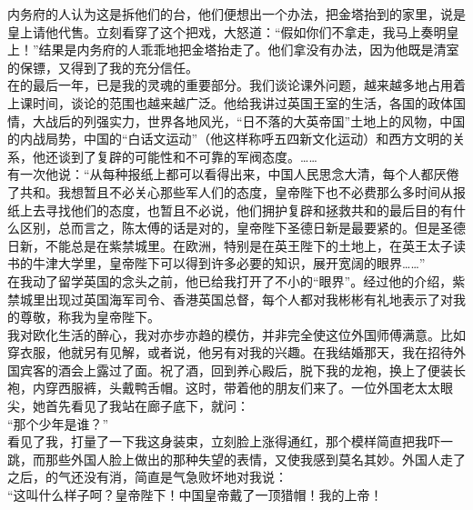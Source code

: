 内务府的人认为这是拆他们的台，他们便想出一个办法，把金塔抬到的家里，说是皇上请他代售。立刻看穿了这个把戏，大怒道：“假如你们不拿走，我马上奏明皇上！”结果是内务府的人乖乖地把金塔抬走了。他们拿没有办法，因为他既是清室的保镖，又得到了我的充分信任。\\

在的最后一年，已是我的灵魂的重要部分。我们谈论课外问题，越来越多地占用着上课时间，谈论的范围也越来越广泛。他给我讲过英国王室的生活，各国的政体国情，大战后的列强实力，世界各地风光，“日不落的大英帝国”土地上的风物，中国的内战局势，中国的“白话文运动”（他这样称呼五四新文化运动）和西方文明的关系，他还谈到了复辟的可能性和不可靠的军阀态度。……\\

有一次他说：“从每种报纸上都可以看得出来，中国人民思念大清，每个人都厌倦了共和。我想暂且不必关心那些军人们的态度，皇帝陛下也不必费那么多时间从报纸上去寻找他们的态度，也暂且不必说，他们拥护复辟和拯救共和的最后目的有什么区别，总而言之，陈太傅的话是对的，皇帝陛下圣德日新是最要紧的。但是圣德日新，不能总是在紫禁城里。在欧洲，特别是在英王陛下的土地上，在英王太子读书的牛津大学里，皇帝陛下可以得到许多必要的知识，展开宽阔的眼界……”\\

在我动了留学英国的念头之前，他已给我打开了不小的“眼界”。经过他的介绍，紫禁城里出现过英国海军司令、香港英国总督，每个人都对我彬彬有礼地表示了对我的尊敬，称我为皇帝陛下。\\

我对欧化生活的醉心，我对亦步亦趋的模仿，并非完全使这位外国师傅满意。比如穿衣服，他就另有见解，或者说，他另有对我的兴趣。在我结婚那天，我在招待外国宾客的酒会上露过了面。祝了酒，回到养心殿后，脱下我的龙袍，换上了便装长袍，内穿西服裤，头戴鸭舌帽。这时，带着他的朋友们来了。一位外国老太太眼尖，她首先看见了我站在廊子底下，就问：\\

“那个少年是谁？”\\

看见了我，打量了一下我这身装束，立刻脸上涨得通红，那个模样简直把我吓一跳，而那些外国人脸上做出的那种失望的表情，又使我感到莫名其妙。外国人走了之后，的气还没有消，简直是气急败坏地对我说：\\

“这叫什么样子呵？皇帝陛下！中国皇帝戴了一顶猎帽！我的上帝！
